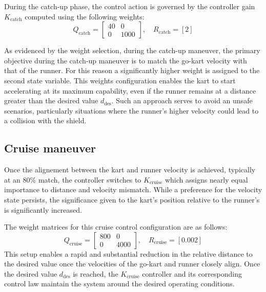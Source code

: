 \documentclass[a4paper,12pt,oneside]{book}
\begin{document}
During the catch-up phase, the control action is governed by the controller gain $K_{\text{catch}}$ computed using the following weights: 
\begin{equation}
    Q_{\text{catch}} =
    \begin{bmatrix}
        40 & 0 \\
        0 & 1000
    \end{bmatrix},
    \quad
    R_{\text{catch}} = [2]
\end{equation}

As evidenced by the weight selection, during the catch-up maneuver, the primary objective during the catch-up maneuver is to match the go-kart velocity with that of the runner.
For this reason a significantly higher weight is assigned to the second state variable.
This weights configuration enables the kart to start accelerating at its maximum capability, even if the runner remains at a distance greater than the desired value $d_{\text{des}}$.
Such an approach serves to avoid an unsafe scenarios, particularly situations where the runner's higher velocity could lead to a collision with the shield.

\subsection{Cruise maneuver}
Once the alignement between the kart and runner velocity is achieved, typically at an 80\% match, the controller switches to $K_{\text{cruise}}$ which assigns nearly equal importance to distance and velocity mismatch.
While a preference for the velocity state persists, the significance given to the kart's position relative to the runner's is significantly increased.

The weight matrices for this cruise control configuration are as follows:
\begin{equation}
    Q_{\text{cruise}} =
    \begin{bmatrix}
        800 & 0 \\
        0 & 4000
    \end{bmatrix},
    \quad
    R_{\text{cruise}} = [0.002]
\end{equation}
This setup enables a rapid and substantial reduction in the relative distance to the desired value once the velocities of the go-kart and runner closely align. 
Once the desired value $d_{\text{des}}$ is reached, the $K_{\text{cruise}}$ controller and its corresponding control law maintain the system around the desired operating conditions.
\end{document}
